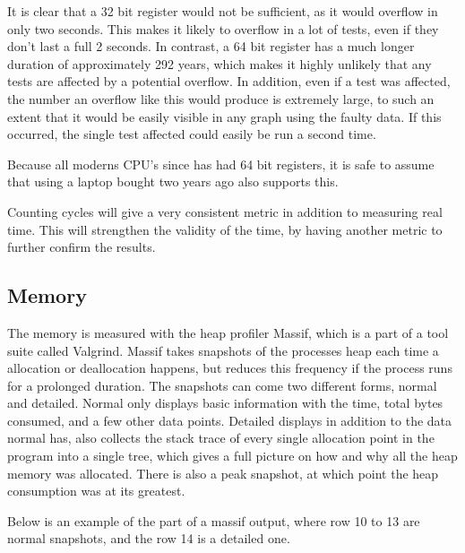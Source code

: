 \bigskip

\noindent It is clear that a 32 bit register would not be sufficient, as it would overflow in only two seconds.
This makes it likely to overflow in a lot of tests, even if they don't last a full 2 seconds.
In contrast, a 64 bit register has a much longer duration of approximately 292 years, which makes it highly unlikely that any tests are affected by a potential overflow.
In addition, even if a test was affected, the number an overflow like this would produce is extremely large, to such an extent that it would be easily visible in any graph using the faulty data.
If this occurred, the single test affected could easily be run a second time.

\smallskip

Because all moderns CPU's since  has had 64 bit registers, it is safe to assume that using a laptop bought two years ago also supports this.

\smallskip

Counting cycles will give a very consistent metric in addition to measuring real time.
This will strengthen the validity of the time, by having another metric to further confirm the results.

\subsection{Memory}
The memory is measured with the heap profiler Massif, which is a part of a tool suite called Valgrind.
Massif takes snapshots of the processes heap each time a allocation or deallocation happens, but reduces this frequency if the process runs for a prolonged duration.
The snapshots can come two different forms, normal and detailed.
Normal only displays basic information with the time, total bytes consumed, and a few other data points.
Detailed displays in addition to the data normal has, also collects the stack trace of every single allocation point in the program into a single tree, which gives a full picture on how and why all the heap memory was allocated.
There is also a peak snapshot, at which point the heap consumption was at its greatest.

Below is an example of the part of a massif output, where row 10 to 13 are normal snapshots, and the row 14 is a detailed one. 

